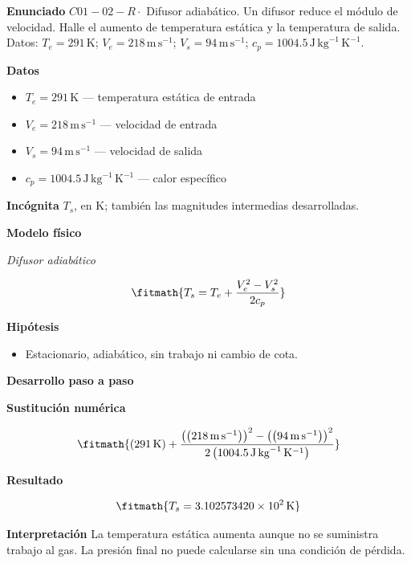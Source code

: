 \documentclass[10pt,openany]{book}
\begin{document}
\begin{tcolorbox}[title={Problema resuelto 2}, studiumworked, breakable]

\noindent\textbf{Enunciado}
\(C01-02-R \cdot\) Difusor adiabático. Un difusor reduce el módulo de velocidad. Halle el aumento de temperatura estática y la temperatura de salida. Datos: \(T_e=291\, \mathrm{K}\); \(V_e=218\, \mathrm{m}\,\mathrm{s}^{-1}\); \(V_s=94\, \mathrm{m}\,\mathrm{s}^{-1}\); \(c_p=1004.5\, \mathrm{J}\,\mathrm{kg}^{-1}\,\mathrm{K}^{-1}\).

\noindent\textbf{Datos}
\begin{itemize}
\item $T_e = 291\,\mathrm{K}$ — temperatura estática de entrada
\item $V_e = 218\,\mathrm{m}\,\mathrm{s}^{-1}$ — velocidad de entrada
\item $V_s = 94\,\mathrm{m}\,\mathrm{s}^{-1}$ — velocidad de salida
\item $c_p = 1004.5\,\mathrm{J}\,\mathrm{kg}^{-1}\,\mathrm{K}^{-1}$ — calor específico
\end{itemize}

\noindent\textbf{Incógnita}
$T_s$, en $\mathrm{K}$; también las magnitudes intermedias desarrolladas.

\noindent\textbf{Modelo físico}

\noindent\textit{Difusor adiabático}

\[
\fitmath{T_s=T_e + \frac{V_e^{2} - V_s^{2}}{2 c_p}}
\]

\noindent\textbf{Hipótesis}
\begin{itemize}
\item Estacionario, adiabático, sin trabajo ni cambio de cota.
\end{itemize}

\noindent\textbf{Desarrollo paso a paso}



\noindent\textbf{Sustitución numérica}

\[
\fitmath{\left(291\,\mathrm{K}\right) + \frac{\left(\left(218\,\mathrm{m}\,\mathrm{s}^{-1}\right)\right)^{2} - \left(\left(94\,\mathrm{m}\,\mathrm{s}^{-1}\right)\right)^{2}}{2 \left(1004.5\,\mathrm{J}\,\mathrm{kg}^{-1}\,\mathrm{K}^{-1}\right)}}
\]

\noindent\textbf{Resultado}

\[
\fitmath{T_s=3.102573420\times10^{2}\,\mathrm{K}}
\]

\noindent\textbf{Interpretación}
La temperatura estática aumenta aunque no se suministra trabajo al gas. La presión final no puede calcularse sin una condición de pérdida.


\end{tcolorbox}
\end{document}
